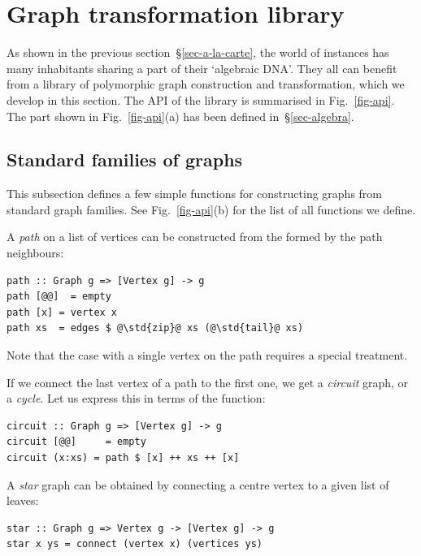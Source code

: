 \section{Graph transformation library}\label{sec-transformations}

As shown in the previous section~\S\ref{sec-a-la-carte}, the world of 
instances has many inhabitants sharing a part of their `algebraic DNA'. They all
can benefit from a library of polymorphic graph construction and transformation,
which we develop in this section. The API of the library is summarised in
Fig.~\ref{fig-api}. The part shown in Fig.~\ref{fig-api}(a) has been defined
in~\S\ref{sec-algebra}.

\subsection{Standard families of graphs}\label{sub-families}

This subsection defines a few simple functions for constructing graphs from
standard graph families. See Fig.~\ref{fig-api}(b) for the list of all functions
we define.

A \emph{path} on a list of vertices can be constructed from the 
formed by the path neighbours:

\begin{verbatim}
path :: Graph g => [Vertex g] -> g
path [@@]  = empty
path [x] = vertex x
path xs  = edges $ @\std{zip}@ xs (@\std{tail}@ xs)
\end{verbatim}

\noindent
Note that the case with a single vertex on the path requires a special treatment.

If we connect the last vertex of a path to the first one, we get a \emph{circuit}
graph, or a \emph{cycle}. Let us express this in terms of the  function:

\begin{verbatim}
circuit :: Graph g => [Vertex g] -> g
circuit [@@]     = empty
circuit (x:xs) = path $ [x] ++ xs ++ [x]
\end{verbatim}

A \emph{star} graph can be obtained by connecting a centre vertex to a given
list of leaves:

\begin{verbatim}
star :: Graph g => Vertex g -> [Vertex g] -> g
star x ys = connect (vertex x) (vertices ys)
\end{verbatim}


